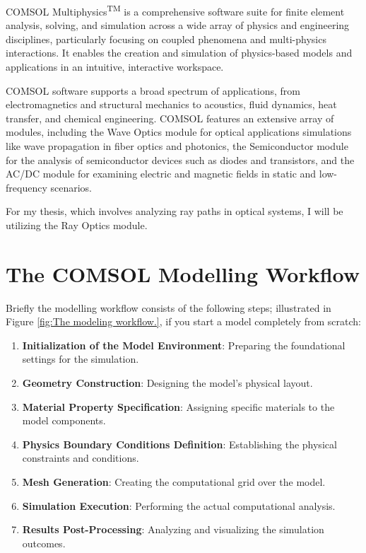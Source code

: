 COMSOL Multiphysics\textsuperscript{TM} is a comprehensive software suite for finite element analysis, solving, and simulation across a wide array of physics and engineering disciplines, particularly focusing on coupled phenomena and multi-physics interactions. It enables the creation and simulation of physics-based models and applications in an intuitive, interactive workspace.

COMSOL software supports a broad spectrum of applications, from electromagnetics and structural mechanics to acoustics, fluid dynamics, heat transfer, and chemical engineering. COMSOL features an extensive array of modules, including the Wave Optics module for optical applications simulations like wave propagation in fiber optics and photonics, the Semiconductor module for the analysis of semiconductor devices such as diodes and transistors, and the AC/DC module for examining electric and magnetic fields in static and low-frequency scenarios.

For my thesis, which involves analyzing ray paths in optical systems, I will be utilizing the Ray Optics module.

\section{The COMSOL Modelling Workflow}
Briefly the modelling workflow consists of the following steps; illustrated in Figure \ref{fig:The modeling workflow.}, if you start a model completely from scratch:

\begin{enumerate}
    \item \textbf{Initialization of the Model Environment}: Preparing the foundational settings for the simulation.
    \item \textbf{Geometry Construction}: Designing the model's physical layout.
    \item \textbf{Material Property Specification}: Assigning specific materials to the model components.
    \item \textbf{Physics Boundary Conditions Definition}: Establishing the physical constraints and conditions.
    \item \textbf{Mesh Generation}: Creating the computational grid over the model.
    \item \textbf{Simulation Execution}: Performing the actual computational analysis.
    \item \textbf{Results Post-Processing}: Analyzing and visualizing the simulation outcomes.
\end{enumerate}

